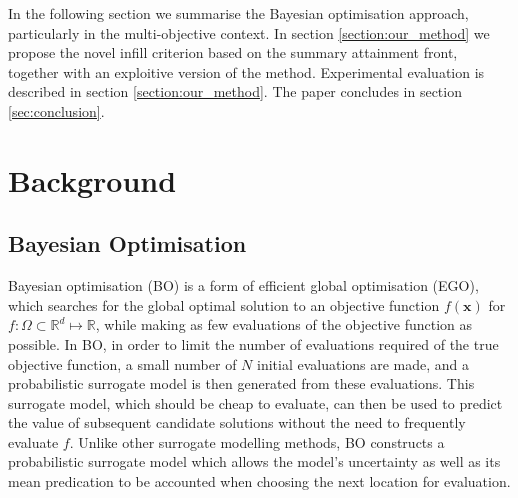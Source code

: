\documentclass[conference]{IEEEtran}
\newcommand{\ninitialevaluations}{N}
\newcommand{\parameterspace}{\Omega}
\newcommand{\ndim}{d}
\begin{document}
In the following section we summarise the Bayesian optimisation approach, particularly in the multi-objective context.  In section \ref{section:our_method} we propose the novel infill criterion based on the summary attainment front, together with an exploitive version of the method.  Experimental evaluation is described in section \ref{section:our_method}.  The paper concludes in section \ref{sec:conclusion}.


\section{Background}
\subsection{Bayesian Optimisation}\label{section:background_BayesianOptimisation}
Bayesian optimisation (BO) is a form of efficient global optimisation (EGO), which searches for the global optimal solution to an objective function $f(\mathbf{x})$ for  $f: \parameterspace \subset \mathbb{R}^{\ndim} \mapsto \mathbb{R}$, while making as few evaluations of the objective function as possible. In BO, in order to limit the number of evaluations required of the true objective function,  a small number of $\ninitialevaluations$ initial evaluations are made, and a probabilistic surrogate model is then generated from these evaluations. This surrogate model, which should be cheap to evaluate, can then be used to predict the value of subsequent candidate solutions without the need to frequently evaluate $f$.   Unlike other surrogate modelling methods, BO constructs a probabilistic surrogate model which allows the model's uncertainty as well as its mean predication to be accounted when choosing the next location for evaluation.
\end{document}
